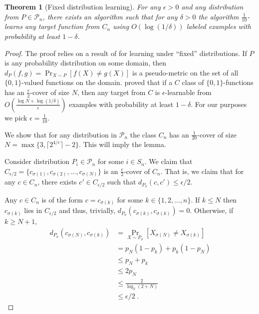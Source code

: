 \documentclass[10pt]{article}
\newtheorem{theorem}[proposition]{Theorem}
\renewcommand{\P}{\mathcal{P}}
\begin{document}
\begin{theorem}[Fixed distribution learning]
For any $\epsilon > 0$ and any distribution from $P \in \P_n$,
there exists an algorithm such that for any $\delta > 0$
the algorithm $\frac{1}{10}$-learns any target function
from $C_n$ using $O \left( \log(1/\delta) \right)$
labeled examples with probability at least $1 - \delta$.
\end{theorem}

\begin{proof}
The proof relies on a result of \cite{Benedek-Itai-1991} for learning under
``fixed'' distributions. If $P$ is any probability distribution on some domain,
then $d_P(f,g) = \Pr_{X \sim P}[f(X) \neq g(X)]$ is a pseudo-metric on the set of all
$\{0,1\}$-valued functions on the domain. \cite{Benedek-Itai-1991} proved that
if a $C$ class of $\{0,1\}$-functions has an $\frac{\epsilon}{2}$-cover of size
$N$, then any target from $C$ is $\epsilon$-learnable from $O
\left( \frac{\log N + \log (1/\delta)}{\epsilon}\right)$ examples
with probability at least $1-\delta$. For our purposes we pick $\epsilon = \frac{1}{10}$.

We show that for any distribution in $\P_n$ the class $C_n$ has an $\frac{1}{20}$-cover of size
$N = \max\{3, \lceil 2^{4/\epsilon}\rceil  - 2 \}$. This will imply the lemma.

Consider distribution $P_i \in \P_n$ for some $i \in S_n$.
We claim that $C_{\epsilon/2} = \{ c_{\sigma(1)},
c_{\sigma(2)}, \dots, c_{\sigma(N)} \}$ is an $\frac{\epsilon}{2}$-cover of
$C_n$. That is, we claim that for any $c \in C_n$, there exists $c' \in
C_{\epsilon/2}$ such that $d_{P_{\sigma}}(c,c') \le \epsilon/2$.

Any $c \in C_n$ is of the form $c = c_{\sigma(k)}$ for some $k \in \{1,2,\dots,n\}$.
If $k \le N$ then $c_{\sigma(k)}$ lies in $C_{\epsilon/2}$ and thus, trivially, $d_{P_{\sigma}}(c_{\sigma(k)},c_{\sigma(k)}) = 0$.
Otherwise, if  $k \ge N + 1$,
\begin{align*}
d_{P_{\sigma}}(c_{\sigma(N)}, c_{\sigma(k)})
& = \Pr_{X \sim P_{\sigma}}[X_{\sigma(N)} \neq X_{\sigma(k)} ] \\
& = p_N (1 - p_k) + p_k (1 - p_N) \\
& \le p_N + p_k \\
& \le 2 p_N \\
& \le \frac{2}{\log_2(2 + N)} \\
& \le \epsilon/2 \; .
\end{align*}
\end{proof}
\end{document}
